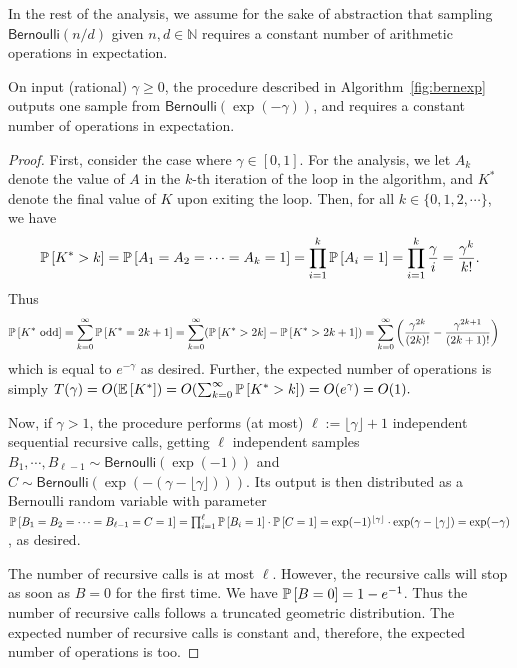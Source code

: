 \documentclass{jpc}
\newcommand{\ex}[2]{{\ifx&#1& \mathbb{E} \else
\underset{#1}{\mathbb{E}} \fi \left[#2\right]}}
\newcommand{\pr}[2]{{\ifx&#1& \mathbb{P} \else
\underset{#1}{\mathbb{P}} \fi \left[#2\right]}}
\newcommand{\eqdef}{:=}
\newcommand{\bern}{\mathsf{Bernoulli}}
\begin{document}
In the rest of the analysis, we assume for the sake of abstraction that sampling $\bern(n/d)$ given $n,d \in \mathbb{N}$ requires a constant number of arithmetic operations in expectation.
\begin{prop}
  \label{prop:sampling:expbernoulli}
  On input (rational) $\gamma\geq 0$, the procedure described in Algorithm~\ref{fig:bernexp} outputs one sample from $\bern(\exp(-\gamma))$, and requires a constant number of operations in expectation.
\end{prop}
\begin{proof}
    First, consider the case where $\gamma\in[0,1]$. For the analysis, we let $A_k$ denote the value of $A$ in the $k$-th iteration of the loop in the algorithm, and $K^\ast$ denote the final value of $K$ upon exiting the loop. Then, for all $k \in \{0,1,2,\cdots\}$, we have 
    \[
      \pr{}{K^\ast > k} = \pr{}{A_1=A_2=\cdots=A_k=1} = \prod_{i=1}^k \pr{}{A_i=1} = \prod_{i=1}^k \frac{\gamma}{i} = \frac{\gamma^k}{k!}.
    \]
    Thus
    \begin{align*}
    \pr{}{K^\ast~\text{odd}} &= \sum_{k=0}^\infty \pr{}{K^\ast=2k+1}
    = \sum_{k=0}^\infty ( \pr{}{K^\ast>2k} - \pr{}{K^\ast>2k+1} )
    = \sum_{k=0}^\infty \left( \frac{\gamma^{2k}}{(2k)!} - \frac{\gamma^{2k+1}}{(2k+1)!} \right)
    \end{align*}
    which is equal to $e^{-\gamma}$ as desired. Further, the expected number of operations is simply 
    $
    T(\gamma)=O(\ex{}{K^\ast}) = O\!\left(\sum_{k=0}^\infty \pr{}{K^\ast > k}\right) = O(e^\gamma) = O(1).
    $\smallskip


    Now, if $\gamma > 1$, the procedure performs (at most) $\ell \eqdef  \lfloor \gamma \rfloor + 1$ independent sequential recursive calls, getting $\ell$ independent samples $B_1,\cdots,B_{\ell-1}\sim\bern(\exp(-1))$ and $C\sim\bern(\exp(-(\gamma-\lfloor\gamma\rfloor)))$. Its output is then distributed as a Bernoulli random variable with parameter\\$\pr{}{B_1=B_2=\cdots=B_{\ell-1}=C=1} = \prod_{i=1}^\ell\pr{}{B_i=1} \cdot \pr{}{C=1} = \exp(-1)^{\lfloor \gamma \rfloor} \cdot \exp(\gamma-\lfloor\gamma\rfloor) = \exp(-\gamma)$, as desired.
    
    The number of recursive calls is at most $\ell$. However, the recursive calls will stop as soon as $B=0$ for the first time. We have $\pr{}{B=0} = 1-e^{-1}$. Thus the number of recursive calls follows a truncated geometric distribution. The expected number of recursive calls is constant and, therefore, the expected number of operations is too.
\end{proof}
\end{document}

